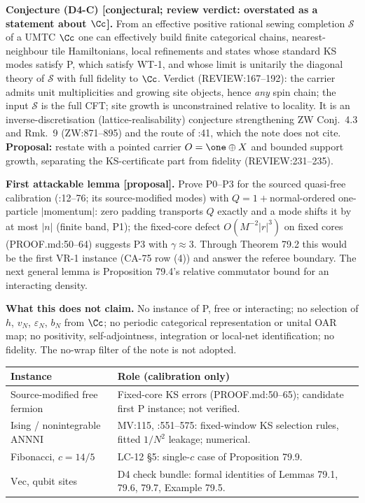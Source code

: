\textbf{Conjecture (D4-C) [conjectural; review verdict: overstated as a statement about
\(\Cc\)].}  From an effective positive rational sewing completion \(\mathcal S\) of a UMTC
\(\Cc\) one can effectively build finite categorical chains, nearest-neighbour tile
Hamiltonians, local refinements and states whose standard KS modes satisfy P, which satisfy
WT-1, and whose limit is unitarily the diagonal theory of \(\mathcal S\) with full fidelity to
\(\Cc\).  Verdict (REVIEW:167--192): the carrier admits unit multiplicities and growing site
objects, hence \emph{any} spin chain; the input \(\mathcal S\) is the full CFT; site growth is
unconstrained relative to locality.  It is an inverse-discretisation (lattice-realisability)
conjecture strengthening ZW Conj.~4.3 and Rmk.~9 (ZW:871--895) and the route of
:41, which the note does not cite.  \textbf{Proposal:} restate with a
pointed carrier \(O=\one\oplus X\) and bounded support growth, separating the KS-certificate
part from fidelity (REVIEW:231--235).

\textbf{First attackable lemma [proposal].}  Prove P0--P3 for the sourced quasi-free
calibration (:12--76; its source-modified
modes) with \(Q=1+{}\)normal-ordered one-particle \(|\)momentum\(|\): zero padding transports
\(Q\) exactly and a mode shifts it by at most \(|n|\) (finite band, P1); the fixed-core defect
\(O(M^{-2}|r|^3)\) on fixed cores (PROOF.md:50--64) suggests P3 with \(\gamma\approx3\).  Through
Theorem 79.2 this would be the first VR-1 instance (CA-75 row (4)) and answer the referee
boundary.  The next general lemma is Proposition 79.4's relative commutator bound for an
interacting density.

\textbf{What this does not claim.}  No instance of P, free or interacting; no
selection of \(h\), \(v_N\), \(\varepsilon_N\), \(b_N\) from \(\Cc\); no periodic categorical
representation or unital OAR map; no positivity, self-adjointness, integration or local-net
identification; no fidelity.  The no-wrap filter of the note is not adopted.

\begin{center}\footnotesize
\begin{tabular}{p{3.6cm}p{10.4cm}}
\toprule
Instance & Role (calibration only) \\
\midrule
Source-modified free fermion & Fixed-core KS errors (PROOF.md:50--65); candidate first P instance; not verified. \\
Ising / nonintegrable ANNNI & MV:115, :551--575: fixed-window KS selection rules, fitted \(1/N^2\) leakage; numerical. \\
Fibonacci, \(c=14/5\) & LC-12 \S5: single-\(c\) case of Proposition 79.9. \\
\(\mathrm{Vec}\), qubit sites & D4 check bundle: formal identities of Lemmas 79.1, 79.6, 79.7, Example 79.5. \\
\bottomrule
\end{tabular}
\end{center}
